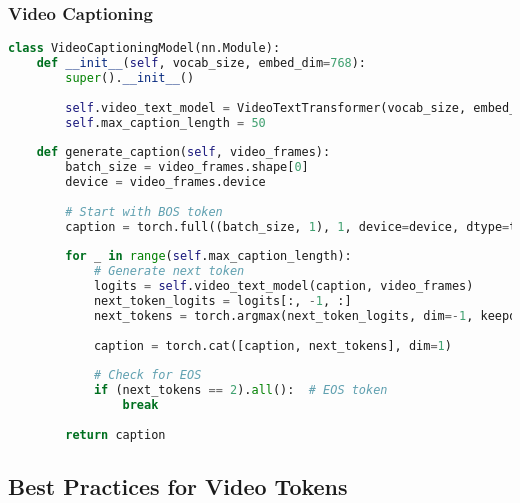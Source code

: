 \subsubsection{Video Captioning}

\begin{lstlisting}[language=Python, caption=Video captioning with temporal tokens]
class VideoCaptioningModel(nn.Module):
    def __init__(self, vocab_size, embed_dim=768):
        super().__init__()
        
        self.video_text_model = VideoTextTransformer(vocab_size, embed_dim)
        self.max_caption_length = 50
        
    def generate_caption(self, video_frames):
        batch_size = video_frames.shape[0]
        device = video_frames.device
        
        # Start with BOS token
        caption = torch.full((batch_size, 1), 1, device=device, dtype=torch.long)
        
        for _ in range(self.max_caption_length):
            # Generate next token
            logits = self.video_text_model(caption, video_frames)
            next_token_logits = logits[:, -1, :]
            next_tokens = torch.argmax(next_token_logits, dim=-1, keepdim=True)
            
            caption = torch.cat([caption, next_tokens], dim=1)
            
            # Check for EOS
            if (next_tokens == 2).all():  # EOS token
                break
        
        return caption
\end{lstlisting}

\subsection{Best Practices for Video Tokens}

